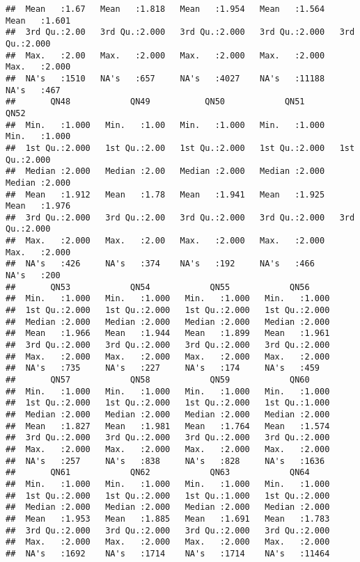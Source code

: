 \documentclass[
]{article}
\begin{document}
\begin{verbatim}
##  Mean   :1.67   Mean   :1.818   Mean   :1.954   Mean   :1.564   Mean   :1.601  
##  3rd Qu.:2.00   3rd Qu.:2.000   3rd Qu.:2.000   3rd Qu.:2.000   3rd Qu.:2.000  
##  Max.   :2.00   Max.   :2.000   Max.   :2.000   Max.   :2.000   Max.   :2.000  
##  NA's   :1510   NA's   :657     NA's   :4027    NA's   :11188   NA's   :467    
##       QN48            QN49           QN50            QN51            QN52      
##  Min.   :1.000   Min.   :1.00   Min.   :1.000   Min.   :1.000   Min.   :1.000  
##  1st Qu.:2.000   1st Qu.:2.00   1st Qu.:2.000   1st Qu.:2.000   1st Qu.:2.000  
##  Median :2.000   Median :2.00   Median :2.000   Median :2.000   Median :2.000  
##  Mean   :1.912   Mean   :1.78   Mean   :1.941   Mean   :1.925   Mean   :1.976  
##  3rd Qu.:2.000   3rd Qu.:2.00   3rd Qu.:2.000   3rd Qu.:2.000   3rd Qu.:2.000  
##  Max.   :2.000   Max.   :2.00   Max.   :2.000   Max.   :2.000   Max.   :2.000  
##  NA's   :426     NA's   :374    NA's   :192     NA's   :466     NA's   :200    
##       QN53            QN54            QN55            QN56      
##  Min.   :1.000   Min.   :1.000   Min.   :1.000   Min.   :1.000  
##  1st Qu.:2.000   1st Qu.:2.000   1st Qu.:2.000   1st Qu.:2.000  
##  Median :2.000   Median :2.000   Median :2.000   Median :2.000  
##  Mean   :1.966   Mean   :1.944   Mean   :1.899   Mean   :1.961  
##  3rd Qu.:2.000   3rd Qu.:2.000   3rd Qu.:2.000   3rd Qu.:2.000  
##  Max.   :2.000   Max.   :2.000   Max.   :2.000   Max.   :2.000  
##  NA's   :735     NA's   :227     NA's   :174     NA's   :459    
##       QN57            QN58            QN59            QN60      
##  Min.   :1.000   Min.   :1.000   Min.   :1.000   Min.   :1.000  
##  1st Qu.:2.000   1st Qu.:2.000   1st Qu.:2.000   1st Qu.:1.000  
##  Median :2.000   Median :2.000   Median :2.000   Median :2.000  
##  Mean   :1.827   Mean   :1.981   Mean   :1.764   Mean   :1.574  
##  3rd Qu.:2.000   3rd Qu.:2.000   3rd Qu.:2.000   3rd Qu.:2.000  
##  Max.   :2.000   Max.   :2.000   Max.   :2.000   Max.   :2.000  
##  NA's   :257     NA's   :838     NA's   :828     NA's   :1636   
##       QN61            QN62            QN63            QN64      
##  Min.   :1.000   Min.   :1.000   Min.   :1.000   Min.   :1.000  
##  1st Qu.:2.000   1st Qu.:2.000   1st Qu.:1.000   1st Qu.:2.000  
##  Median :2.000   Median :2.000   Median :2.000   Median :2.000  
##  Mean   :1.953   Mean   :1.885   Mean   :1.691   Mean   :1.783  
##  3rd Qu.:2.000   3rd Qu.:2.000   3rd Qu.:2.000   3rd Qu.:2.000  
##  Max.   :2.000   Max.   :2.000   Max.   :2.000   Max.   :2.000  
##  NA's   :1692    NA's   :1714    NA's   :1714    NA's   :11464  

\end{verbatim}
\end{document}
